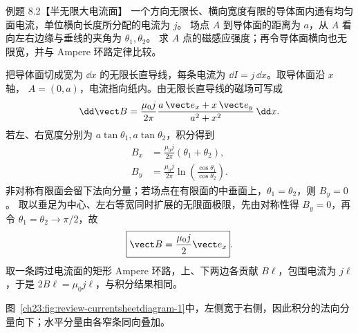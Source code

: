 \begin{origexamplebox}{例题 8.2【半无限大电流面】}
一个方向无限长、横向宽度有限的导体面内通有均匀面电流，单位横向长度所分配的电流为 $j$。
场点 $A$ 到导体面的距离为 $a$，从 $A$ 看向左右边缘与垂线的夹角为 $\theta_1,\theta_2$。
求 $A$ 点的磁感应强度；再令导体面横向也无限宽，并与 Ampere 环路定律比较。

%
\begin{center}
\end{center}
\label{fig:em23-question-2}
\end{origexamplebox}

\begin{xesolution}
把导体面切成宽为 $\dd x$ 的无限长直导线，每条电流为 $\dd I=j\,\dd x$。取导体面沿 $x$ 轴，
$A=(0,a)$，电流指向纸内。由无限长直导线的磁场可写成
\[
  \dd\vect B=\frac{\mu_0j}{2\pi}
  \frac{a\,\vect e_x+x\,\vect e_y}{a^2+x^2}\,\dd x.
\]
若左、右宽度分别为 $a\tan\theta_1,a\tan\theta_2$，积分得到
\begin{align}
  B_x&=\frac{\mu_0j}{2\pi}(\theta_1+\theta_2),\\
  B_y&=\frac{\mu_0j}{2\pi}
  \ln\!\left(\frac{\cos\theta_1}{\cos\theta_2}\right).
\end{align}
非对称有限面会留下法向分量；若场点在有限面的中垂面上，$\theta_1=\theta_2$，则 $B_y=0$。
取以垂足为中心、左右等宽同时扩展的无限面极限，先由对称性得 $B_y=0$，再令 $\theta_1=\theta_2\to\pi/2$，故
\begin{equation}
  \boxed{\vect B=\frac{\mu_0j}{2}\vect e_x}.
\end{equation}
取一条跨过电流面的矩形 Ampere 环路，上、下两边各贡献 $B\ell$，包围电流为 $j\ell$，于是
$2B\ell=\mu_0j\ell$，与积分结果相同。

图~\ref{ch23:fig:review-currentsheetdiagram-1}中，左侧宽于右侧，因此积分的法向分量向下；水平分量由各窄条同向叠加。
\par\noindent\begin{minipage}{\linewidth}
\currentSheetDiagram
{}\label{ch23:fig:review-currentsheetdiagram-1}
\end{minipage}\par\medskip
\end{xesolution}

